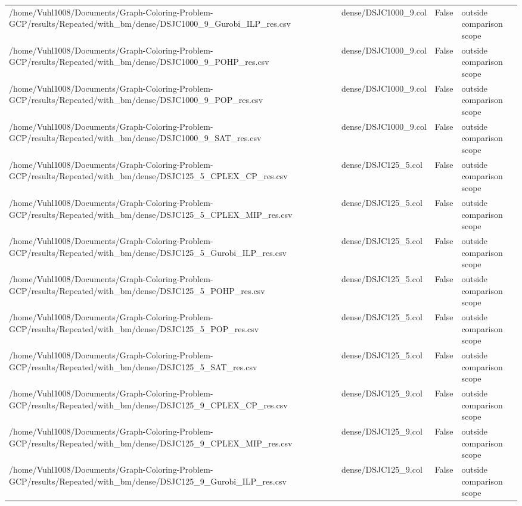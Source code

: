\begin{table}[htbp]
\begin{tabular}{llll}
/home/Vuhl1008/Documents/Graph-Coloring-Problem-GCP/results/Repeated/with\_bm/dense/DSJC1000\_9\_Gurobi\_ILP\_res.csv & dense/DSJC1000\_9.col & False & outside comparison scope \\
/home/Vuhl1008/Documents/Graph-Coloring-Problem-GCP/results/Repeated/with\_bm/dense/DSJC1000\_9\_POHP\_res.csv & dense/DSJC1000\_9.col & False & outside comparison scope \\
/home/Vuhl1008/Documents/Graph-Coloring-Problem-GCP/results/Repeated/with\_bm/dense/DSJC1000\_9\_POP\_res.csv & dense/DSJC1000\_9.col & False & outside comparison scope \\
/home/Vuhl1008/Documents/Graph-Coloring-Problem-GCP/results/Repeated/with\_bm/dense/DSJC1000\_9\_SAT\_res.csv & dense/DSJC1000\_9.col & False & outside comparison scope \\
/home/Vuhl1008/Documents/Graph-Coloring-Problem-GCP/results/Repeated/with\_bm/dense/DSJC125\_5\_CPLEX\_CP\_res.csv & dense/DSJC125\_5.col & False & outside comparison scope \\
/home/Vuhl1008/Documents/Graph-Coloring-Problem-GCP/results/Repeated/with\_bm/dense/DSJC125\_5\_CPLEX\_MIP\_res.csv & dense/DSJC125\_5.col & False & outside comparison scope \\
/home/Vuhl1008/Documents/Graph-Coloring-Problem-GCP/results/Repeated/with\_bm/dense/DSJC125\_5\_Gurobi\_ILP\_res.csv & dense/DSJC125\_5.col & False & outside comparison scope \\
/home/Vuhl1008/Documents/Graph-Coloring-Problem-GCP/results/Repeated/with\_bm/dense/DSJC125\_5\_POHP\_res.csv & dense/DSJC125\_5.col & False & outside comparison scope \\
/home/Vuhl1008/Documents/Graph-Coloring-Problem-GCP/results/Repeated/with\_bm/dense/DSJC125\_5\_POP\_res.csv & dense/DSJC125\_5.col & False & outside comparison scope \\
/home/Vuhl1008/Documents/Graph-Coloring-Problem-GCP/results/Repeated/with\_bm/dense/DSJC125\_5\_SAT\_res.csv & dense/DSJC125\_5.col & False & outside comparison scope \\
/home/Vuhl1008/Documents/Graph-Coloring-Problem-GCP/results/Repeated/with\_bm/dense/DSJC125\_9\_CPLEX\_CP\_res.csv & dense/DSJC125\_9.col & False & outside comparison scope \\
/home/Vuhl1008/Documents/Graph-Coloring-Problem-GCP/results/Repeated/with\_bm/dense/DSJC125\_9\_CPLEX\_MIP\_res.csv & dense/DSJC125\_9.col & False & outside comparison scope \\
/home/Vuhl1008/Documents/Graph-Coloring-Problem-GCP/results/Repeated/with\_bm/dense/DSJC125\_9\_Gurobi\_ILP\_res.csv & dense/DSJC125\_9.col & False & outside comparison scope \\

\end{tabular}
\end{table}
